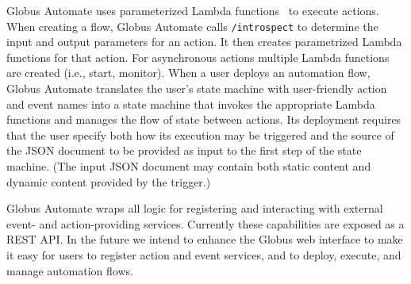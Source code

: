 \documentclass{aip-cp}
\newcommand\code[1]{{\tt \footnotesize #1}}
\newcommand\darkcode[1]{\code{#1}}
\begin{document}
Globus Automate uses parameterized Lambda functions~\cite{AmazonLambda} to execute actions. 
When creating a flow, Globus Automate calls \darkcode{/introspect} 
to determine the input and output parameters for an action. It then creates 
parametrized Lambda functions for that action. 
For asynchronous actions multiple Lambda functions are created (i.e., start, monitor).
When a user deploys an automation flow, Globus Automate translates the user's state machine 
with user-friendly action and event names into a state machine that invokes the appropriate 
Lambda functions and manages the flow of state between actions. 
Its deployment requires that the user specify both how its execution may be triggered and the source 
of
the JSON document to be provided as input to the first step of the state machine. 
(The input JSON document may contain both static content and 
dynamic content provided by the trigger.)

Globus Automate wraps all logic for registering and interacting with external event- and 
action-providing services.  Currently these capabilities are exposed as a REST API. 
In the future we intend to enhance the Globus web interface to make it 
easy for users to register action and event services,
and to deploy, execute, and manage automation flows.
\end{document}
